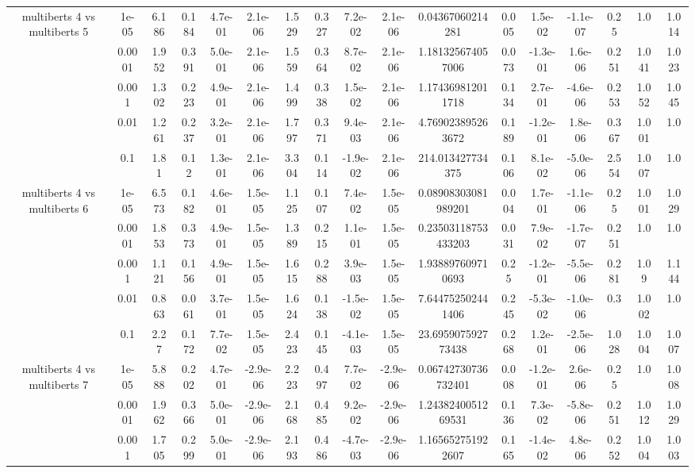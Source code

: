 \begin{tabular}{|c|c|c|c|c|c|c|c|c|c|c|c|c|c|c|c|c|}
\hline
\multirow{5}{*}{multiberts 4 vs multiberts 5} & 1e-05 & 6.186 & 0.184 & 4.7e-01 & 2.1e-06 & 1.529 & 0.327 & 7.2e-02 & 2.1e-06 & 0.04367060214281 & 0.005 & 1.5e-02 & -1.1e-07 & 0.25 & 1.0 & 1.014 \\
 & 0.0001 & 1.952 & 0.391 & 5.0e-01 & 2.1e-06 & 1.559 & 0.364 & 8.7e-02 & 2.1e-06 & 1.181325674057006 & 0.073 & -1.3e-01 & 1.6e-06 & 0.251 & 1.041 & 1.023 \\
 & 0.001 & 1.302 & 0.223 & 4.9e-01 & 2.1e-06 & 1.499 & 0.338 & 1.5e-02 & 2.1e-06 & 1.174369812011718 & 0.134 & 2.7e-01 & -4.6e-06 & 0.253 & 1.052 & 1.045 \\
 & 0.01 & 1.261 & 0.237 & 3.2e-01 & 2.1e-06 & 1.797 & 0.371 & 9.4e-03 & 2.1e-06 & 4.769023895263672 & 0.189 & -1.2e-01 & 1.8e-06 & 0.367 & 1.001 & 1.0 \\
 & 0.1 & 1.81 & 0.12 & 1.3e-01 & 2.1e-06 & 3.304 & 0.114 & -1.9e-02 & 2.1e-06 & 214.013427734375 & 0.106 & 8.1e-02 & -5.0e-06 & 2.554 & 1.007 & 1.0 \\
\hline
\multirow{5}{*}{multiberts 4 vs multiberts 6} & 1e-05 & 6.573 & 0.182 & 4.6e-01 & 1.5e-05 & 1.125 & 0.107 & 7.4e-02 & 1.5e-05 & 0.08908303081989201 & 0.004 & 1.7e-01 & -1.1e-06 & 0.25 & 1.001 & 1.029 \\
 & 0.0001 & 1.853 & 0.373 & 4.9e-01 & 1.5e-05 & 1.389 & 0.215 & 1.1e-01 & 1.5e-05 & 0.23503118753433203 & 0.031 & 7.9e-02 & -1.7e-07 & 0.251 & 1.0 & 1.0 \\
 & 0.001 & 1.121 & 0.156 & 4.9e-01 & 1.5e-05 & 1.615 & 0.288 & 3.9e-03 & 1.5e-05 & 1.938897609710693 & 0.25 & -1.2e-01 & -5.5e-06 & 0.281 & 1.09 & 1.144 \\
 & 0.01 & 0.863 & 0.061 & 3.7e-01 & 1.5e-05 & 1.624 & 0.138 & -1.5e-02 & 1.5e-05 & 7.644752502441406 & 0.245 & -5.3e-02 & -1.0e-06 & 0.3 & 1.002 & 1.0 \\
 & 0.1 & 2.27 & 0.172 & 7.7e-02 & 1.5e-05 & 2.423 & 0.145 & -4.1e-03 & 1.5e-05 & 23.695907592773438 & 0.268 & 1.2e-01 & -2.5e-06 & 1.028 & 1.004 & 1.007 \\
\hline
\multirow{5}{*}{multiberts 4 vs multiberts 7} & 1e-05 & 5.888 & 0.202 & 4.7e-01 & -2.9e-06 & 2.223 & 0.497 & 7.7e-02 & -2.9e-06 & 0.06742730736732401 & 0.008 & -1.2e-01 & 2.6e-06 & 0.25 & 1.0 & 1.008 \\
 & 0.0001 & 1.962 & 0.366 & 5.0e-01 & -2.9e-06 & 2.168 & 0.485 & 9.2e-02 & -2.9e-06 & 1.2438240051269531 & 0.136 & 7.3e-02 & -5.8e-06 & 0.251 & 1.012 & 1.029 \\
 & 0.001 & 1.705 & 0.299 & 5.0e-01 & -2.9e-06 & 2.193 & 0.486 & -4.7e-03 & -2.9e-06 & 1.165652751922607 & 0.165 & -1.4e-02 & 4.8e-06 & 0.252 & 1.004 & 1.003 \\

\end{tabular}

